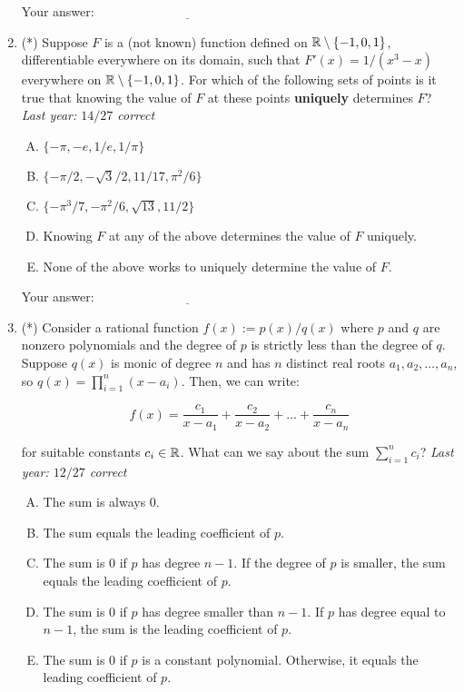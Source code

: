 \documentclass[10pt]{amsart}
\begin{document}
\begin{enumerate}
  \vspace{0.1in}
  Your answer: $\underline{\qquad\qquad\qquad\qquad\qquad\qquad\qquad}$
  \vspace{0.1in}


\item (*) Suppose $F$ is a (not known) function defined on $\mathbb{R} \setminus
  \{ -1,0,1\}$, differentiable everywhere on its domain, such that
  $F'(x) = 1/(x^3 - x)$ everywhere on $\mathbb{R} \setminus \{-1,0,1\}$. For
  which of the following sets of points is it true that knowing the
  value of $F$ at these points {\bf uniquely} determines $F$? {\em
  Last year: $14/27$ correct}

  \begin{enumerate}[(A)]
  \item $\{ -\pi, -e, 1/e,1/\pi \}$
  \item $\{ -\pi/2, -\sqrt{3}/2, 11/17,\pi^2/6 \}$
  \item $\{ -\pi^3/7,-\pi^2/6,\sqrt{13},11/2 \}$
  \item Knowing $F$ at any of the above determines the value of $F$
    uniquely.
  \item None of the above works to uniquely determine the value of
    $F$.
  \end{enumerate}

  \vspace{0.1in}
  Your answer: $\underline{\qquad\qquad\qquad\qquad\qquad\qquad\qquad}$
  \vspace{0.1in}

\item (*) Consider a rational function $f(x) := p(x)/q(x)$ where $p$
  and $q$ are nonzero polynomials and the degree of $p$ is strictly
  less than the degree of $q$. Suppose $q(x)$ is monic of degree $n$
  and has $n$ distinct real roots $a_1,a_2,\dots,a_n$, so $q(x) =
  \prod_{i=1}^n (x - a_i)$. Then, we can write:

  $$f(x) = \frac{c_1}{x - a_1} + \frac{c_2}{x - a_2} + \dots + \frac{c_n}{x - a_n}$$

  for suitable constants $c_i \in \mathbb{R}$. What can we say about the sum
  $\sum_{i=1}^n c_i$? {\em Last year: $12/27$ correct}

  \begin{enumerate}[(A)]
  \item The sum is always $0$.
  \item The sum equals the leading coefficient of $p$.
  \item The sum is $0$ if $p$ has degree $n - 1$. If the degree of $p$
  is smaller, the sum equals the leading coefficient of $p$.
  \item The sum is $0$ if $p$ has degree smaller than $n - 1$. If $p$
    has degree equal to $n - 1$, the sum is the leading coefficient of
    $p$.
  \item The sum is $0$ if $p$ is a constant polynomial. Otherwise, it
    equals the leading coefficient of $p$.
  \end{enumerate}


\end{enumerate}
\end{document}
